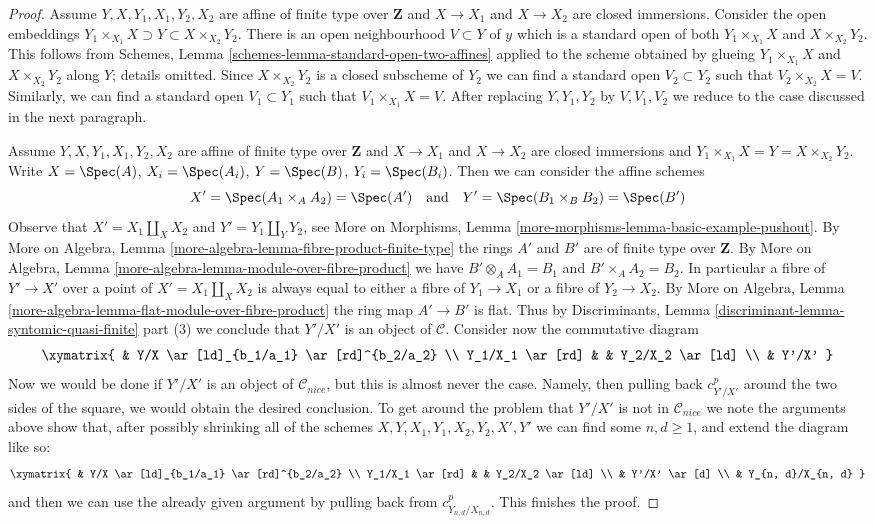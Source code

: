 \begin{proof}
\medskip\noindent
Assume $Y, X, Y_1, X_1, Y_2, X_2$ are affine of finite type over
$\mathbf{Z}$ and $X \to X_1$ and $X \to X_2$ are closed immersions.
Consider the open embeddings
$Y_1 \times_{X_1} X \supset Y \subset X \times_{X_2} Y_2$.
There is an open neighbourhood $V \subset Y$ of $y$ which is a
standard open of both $Y_1 \times_{X_1} X$ and $X \times_{X_2} Y_2$.
This follows from Schemes, Lemma \ref{schemes-lemma-standard-open-two-affines}
applied to the scheme obtained by glueing $Y_1 \times_{X_1} X$ and
$X \times_{X_2} Y_2$ along $Y$; details omitted.
Since $X \times_{X_2} Y_2$ is a closed subscheme of $Y_2$
we can find a standard open $V_2 \subset Y_2$ such that
$V_2 \times_{X_2} X = V$. Similarly, we can find a standard open
$V_1 \subset Y_1$ such that $V_1 \times_{X_1} X = V$.
After replacing $Y, Y_1, Y_2$ by $V, V_1, V_2$ we reduce to the
case discussed in the next paragraph.

\medskip\noindent
Assume $Y, X, Y_1, X_1, Y_2, X_2$ are affine of finite type over
$\mathbf{Z}$ and $X \to X_1$ and $X \to X_2$ are closed immersions
and $Y_1 \times_{X_1} X = Y = X \times_{X_2} Y_2$.
Write $X = \Spec(A)$, $X_i = \Spec(A_i)$, $Y = \Spec(B)$,
$Y_i = \Spec(B_i)$. Then we can consider the affine schemes
$$
X' = \Spec(A_1 \times_A A_2) = \Spec(A')
\quad\text{and}\quad
Y' = \Spec(B_1 \times_B B_2) = \Spec(B')
$$
Observe that $X' = X_1 \amalg_X X_2$ and $Y' = Y_1 \amalg_Y Y_2$, see
More on Morphisms, Lemma \ref{more-morphisms-lemma-basic-example-pushout}.
By More on Algebra, Lemma \ref{more-algebra-lemma-fibre-product-finite-type}
the rings $A'$ and $B'$ are of finite type over $\mathbf{Z}$. By
More on Algebra, Lemma \ref{more-algebra-lemma-module-over-fibre-product}
we have $B' \otimes_A A_1 = B_1$ and $B' \times_A A_2 = B_2$.
In particular a fibre of $Y' \to X'$ over a point of
$X' = X_1 \amalg_X X_2$ is always equal to either a fibre of $Y_1 \to X_1$
or a fibre of $Y_2 \to X_2$. By More on Algebra, Lemma
\ref{more-algebra-lemma-flat-module-over-fibre-product}
the ring map $A' \to B'$ is flat. Thus by Discriminants, Lemma
\ref{discriminant-lemma-syntomic-quasi-finite} part (3)
we conclude that $Y'/X'$ is an object of $\mathcal{C}$.
Consider now the commutative diagram
$$
\xymatrix{
& Y/X \ar[ld]_{b_1/a_1} \ar[rd]^{b_2/a_2} \\
Y_1/X_1 \ar[rd] & & Y_2/X_2 \ar[ld] \\
& Y'/X'
}
$$
Now we would be done if $Y'/X'$ is an object of $\mathcal{C}_{nice}$,
but this is almost never the case. Namely, then pulling back $c^p_{Y'/X'}$
around the two sides of the square, we would obtain the desired conclusion.
To get around the problem that $Y'/X'$ is not in $\mathcal{C}_{nice}$
we note the arguments above show that, after possibly shrinking all
of the schemes $X, Y, X_1, Y_1, X_2, Y_2, X', Y'$ we can find some
$n, d \geq 1$, and extend the diagram like so:
$$
\xymatrix{
& Y/X \ar[ld]_{b_1/a_1} \ar[rd]^{b_2/a_2} \\
Y_1/X_1 \ar[rd] & & Y_2/X_2 \ar[ld] \\
& Y'/X' \ar[d] \\
& Y_{n, d}/X_{n, d}
}
$$
and then we can use the already given argument by pulling
back from $c^p_{Y_{n, d}/X_{n, d}}$. This finishes the proof.
\end{proof}
